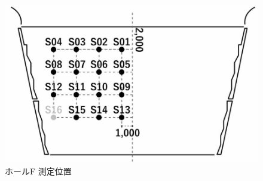 \documentclass[11pt,a4j]{jreport}
\begin{document}
\begin{figure}[H]
\begin{minipage}{0.5\textwidth}
    \includegraphics[width=.8\linewidth]{images/measuredHalls/resized/flat_f.jpg}
    \\ホールF 測定位置
  \end{minipage}%
  \begin{minipage}{.5\linewidth} %
    \raggedleft

\end{minipage}
\end{figure}
\end{document}
